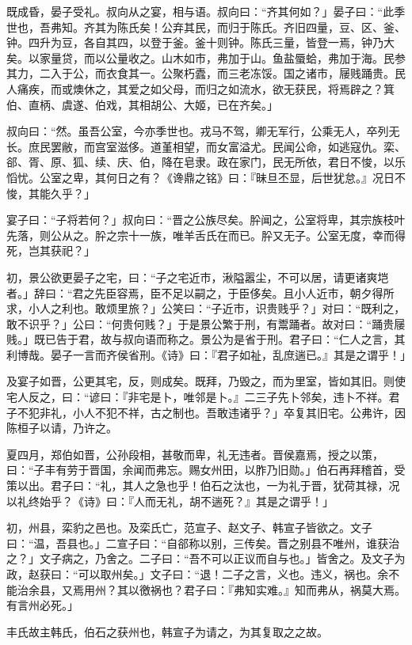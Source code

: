 \documentclass[]{article}
\begin{document}
既成昏，晏子受礼。叔向从之宴，相与语。叔向曰：``齐其何如？」晏子曰：``此季世也，吾弗知。齐其为陈氏矣！公弃其民，而归于陈氏。齐旧四量，豆、区、釜、钟。四升为豆，各自其四，以登于釜。釜十则钟。陈氏三量，皆登一焉，钟乃大矣。以家量贷，而以公量收之。山木如市，弗加于山。鱼盐蜃蛤，弗加于海。民参其力，二入于公，而衣食其一。公聚朽蠹，而三老冻馁。国之诸市，屦贱踊贵。民人痛疾，而或燠休之，其爱之如父母，而归之如流水，欲无获民，将焉辟之？箕伯、直柄、虞遂、伯戏，其相胡公、大姬，已在齐矣。」

叔向曰：``然。虽吾公室，今亦季世也。戎马不驾，卿无军行，公乘无人，卒列无长。庶民罢敝，而宫室滋侈。道堇相望，而女富溢尤。民闻公命，如逃寇仇。栾、郤、胥、原、狐、续、庆、伯，降在皂隶。政在家门，民无所依，君日不悛，以乐慆忧。公室之卑，其何日之有？《谗鼎之铭》曰：『昧旦丕显，后世犹怠。』况日不悛，其能久乎？」

宴子曰：``子将若何？」叔向曰：``晋之公族尽矣。肸闻之，公室将卑，其宗族枝叶先落，则公从之。肸之宗十一族，唯羊舌氏在而已。肸又无子。公室无度，幸而得死，岂其获祀？」

初，景公欲更晏子之宅，曰：``子之宅近市，湫隘嚣尘，不可以居，请更诸爽垲者。」辞曰：``君之先臣容焉，臣不足以嗣之，于臣侈矣。且小人近市，朝夕得所求，小人之利也。敢烦里旅？」公笑曰：``子近市，识贵贱乎？」对曰：``既利之，敢不识乎？」公曰：``何贵何贱？」于是景公繁于刑，有鬻踊者。故对曰：``踊贵屦贱。」既已告于君，故与叔向语而称之。景公为是省于刑。君子曰：``仁人之言，其利博哉。晏子一言而齐侯省刑。《诗》曰：『君子如祉，乱庶遄已。』其是之谓乎！」

及宴子如晋，公更其宅，反，则成矣。既拜，乃毁之，而为里室，皆如其旧。则使宅人反之，曰：``谚曰：『非宅是卜，唯邻是卜。』二三子先卜邻矣，违卜不祥。君子不犯非礼，小人不犯不祥，古之制也。吾敢违诸乎？」卒复其旧宅。公弗许，因陈桓子以请，乃许之。

夏四月，郑伯如晋，公孙段相，甚敬而卑，礼无违者。晋侯嘉焉，授之以策，曰：``子丰有劳于晋国，余闻而弗忘。赐女州田，以胙乃旧勋。」伯石再拜稽首，受策以出。君子曰：``礼，其人之急也乎！伯石之汰也，一为礼于晋，犹荷其禄，况以礼终始乎？《诗》曰：『人而无礼，胡不遄死？』其是之谓乎！」

初，州县，栾豹之邑也。及栾氏亡，范宣子、赵文子、韩宣子皆欲之。文子曰：``温，吾县也。」二宣子曰：``自郤称以别，三传矣。晋之别县不唯州，谁获治之？」文子病之，乃舍之。二子曰：``吾不可以正议而自与也。」皆舍之。及文子为政，赵获曰：``可以取州矣。」文子曰：``退！二子之言，义也。违义，祸也。余不能治余县，又焉用州？其以徼祸也？君子曰：『弗知实难。』知而弗从，祸莫大焉。有言州必死。」

丰氏故主韩氏，伯石之获州也，韩宣子为请之，为其复取之之故。
\end{document}
